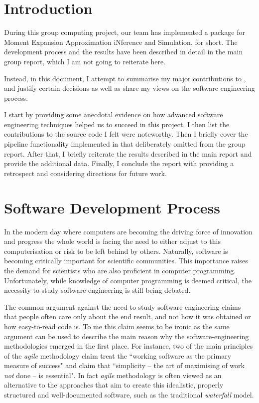 \section{Introduction}

During this group computing project, our team has implemented a \py{} package for Moment Expansion Approximation iNference and Simulation, \means{} for short. 
The development process and the results have been described in detail in the main group report, which I am not going to reiterate here.

Instead, in this document, I attempt to summarise my major contributions to \means{}, and justify certain decisions as well as share my views on the software engineering process.

I start by providing some anecdotal evidence on how advanced software engineering techniques helped us to succeed in this project. 
I then list the contributions to the source code I felt were noteworthy. Then I briefly cover the pipeline functionality implemented in \means{} that deliberately omitted from the group report.
After that, I briefly reiterate the results described in the main report and provide the additional data.
Finally, I conclude the report with providing a retrospect and considering directions for future work.

\section{Software Development Process}

In the modern day where computers are becoming the driving force of innovation and progress the whole world is facing the need to either adjust to this computerisation or risk to be left behind by others.
Naturally, software is becoming critically important for scientific communities. This importance raises the demand for scientists who are also proficient in computer programming. Unfortunately, while knowledge of computer programming is deemed critical, the necessity to study software engineering is still being debated. 

The common argument against the need to study software engineering claims that people often care only about the end result, and not how it was obtained or how easy-to-read code is.
To me this claim seems to be ironic as the same argument can be used to describe the main reason why the software-engineering methodologies emerged in the first place. 
For instance, two of the main principles of the \emph{agile} methodology\cite{_manifesto_????} claim treat the ``working software as the primary measure of success" and claim that ``simplicity -- the art of maximising of work \emph{not} done -- is essential"\cite{paulk_agile_2002}. 
In fact \emph{agile} methodology is often viewed as an alternative to the approaches that aim to create this idealistic, properly structured and well-documented software, such as the traditional \emph{waterfall} model.

